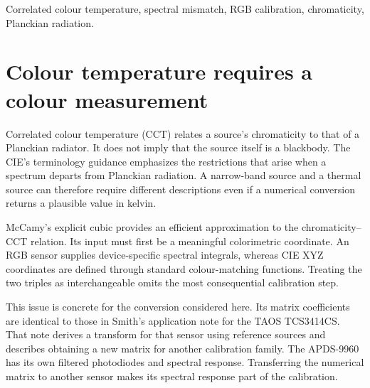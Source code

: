 \begin{abstract}
A broad-band colour sensor can order source colours consistently, with its temperature scale set by the colour calibration. Example APDS-9960 counts are corrected for dark offsets, normalized by the clear response and transformed using a provisional RGB-to-XYZ matrix before applying McCamy's cubic approximation. Interior-window means are 2548, 3935 and 6114 K for warm, intermediate and cool states, with within-window standard deviations of 25, 18 and 91 K. The matrix is traced to a TCS3414CS application note, linking the temperature conversion to the transfer of a sensor-specific spectral calibration. The analysis distinguishes repeatable numerical conversion from colorimetric accuracy and from the physical temperature of an emitting body.
\end{abstract}
\begin{IEEEkeywords}
Correlated colour temperature, spectral mismatch, RGB calibration, chromaticity, Planckian radiation.
\end{IEEEkeywords}

\section{Colour temperature requires a colour measurement}
Correlated colour temperature (CCT) relates a source's chromaticity to that of a Planckian radiator. It does not imply that the source itself is a blackbody. The CIE's terminology guidance emphasizes the restrictions that arise when a spectrum departs from Planckian radiation\cite{CIE2022TN013}. A narrow-band source and a thermal source can therefore require different descriptions even if a numerical conversion returns a plausible value in kelvin.

McCamy's explicit cubic provides an efficient approximation to the chromaticity--CCT relation\cite{McCamy1992}. Its input must first be a meaningful colorimetric coordinate. An RGB sensor supplies device-specific spectral integrals, whereas CIE XYZ coordinates are defined through standard colour-matching functions. Treating the two triples as interchangeable omits the most consequential calibration step.

This issue is concrete for the conversion considered here. Its matrix coefficients are identical to those in Smith's application note for the TAOS TCS3414CS\cite{Smith2009TAOSAN000517}. That note derives a transform for that sensor using reference sources and describes obtaining a new matrix for another calibration family. The APDS-9960 has its own filtered photodiodes and spectral response\cite{apds9960}. Transferring the numerical matrix to another sensor makes its spectral response part of the calibration.

